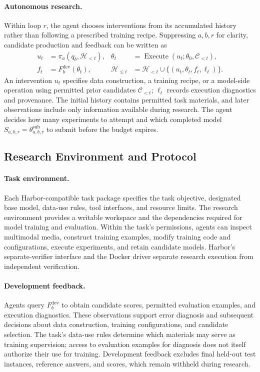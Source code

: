 \paragraph{Autonomous research.}
Within loop $r$, the agent chooses interventions from its accumulated history rather than following a prescribed training recipe. Suppressing $a,b,r$ for clarity, candidate production and feedback can be written as
\begin{align}
u_t&=\pi_a(q_b,\mathcal{H}_{<t}), &
\theta_t&=\operatorname{Execute}(u_t;\theta_0,\mathcal{C}_{<t}),\nonumber\\
f_t&=F_b^{\mathrm{dev}}(\theta_t), &
\mathcal{H}_{\le t}&=\mathcal{H}_{<t}\cup\{(u_t,\theta_t,f_t,\ell_t)\}.
\label{eq:research-process}
\end{align}
An intervention $u_t$ specifies data construction, a training recipe, or a model-side operation using permitted prior candidates $\mathcal{C}_{<t}$; $\ell_t$ records execution diagnostics and provenance. The initial history contains permitted task materials, and later observations include only information available during research. The agent decides how many experiments to attempt and which completed model $S_{a,b,r}=\theta^{\mathrm{sub}}_{a,b,r}$ to submit before the budget expires.



\subsection{Research Environment and Protocol}
\label{sec:environment}
\paragraph{Task environment.}
Each Harbor-compatible task package specifies the task objective, designated base model, data-use rules, tool interfaces, and resource limits. The research environment provides a writable workspace and the dependencies required for model training and evaluation. Within the task's permissions, agents can inspect multimodal media, construct training examples, modify training code and configurations, execute experiments, and retain candidate models. Harbor's separate-verifier interface and the Docker driver separate research execution from independent verification.

\paragraph{Development feedback.}
Agents query $F_b^{\mathrm{dev}}$ to obtain candidate scores, permitted evaluation examples, and execution diagnostics. These observations support error diagnosis and subsequent decisions about data construction, training configurations, and candidate selection. The task's data-use rules determine which materials may serve as training supervision; access to evaluation examples for diagnosis does not itself authorize their use for training. Development feedback excludes final held-out test instances, reference answers, and scores, which remain withheld during research.


